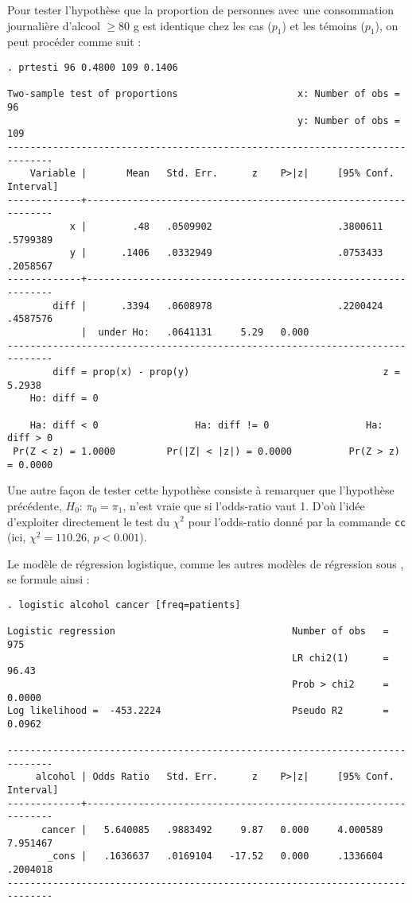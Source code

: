 Pour tester l'hypothèse que la proportion de personnes avec une consommation
journalière d'alcool $\ge 80$ g est identique chez les cas ($p_1$) et les
témoins ($p_1$), on peut procéder comme suit :
\begin{verbatim}
. prtesti 96 0.4800 109 0.1406

Two-sample test of proportions                     x: Number of obs =       96
                                                   y: Number of obs =      109
------------------------------------------------------------------------------
    Variable |       Mean   Std. Err.      z    P>|z|     [95% Conf. Interval]
-------------+----------------------------------------------------------------
           x |        .48   .0509902                      .3800611    .5799389
           y |      .1406   .0332949                      .0753433    .2058567
-------------+----------------------------------------------------------------
        diff |      .3394   .0608978                      .2200424    .4587576
             |  under Ho:   .0641131     5.29   0.000
------------------------------------------------------------------------------
        diff = prop(x) - prop(y)                                  z =   5.2938
    Ho: diff = 0

    Ha: diff < 0                 Ha: diff != 0                 Ha: diff > 0
 Pr(Z < z) = 1.0000         Pr(|Z| < |z|) = 0.0000          Pr(Z > z) = 0.0000
\end{verbatim}

Une autre façon de tester cette hypothèse consiste à remarquer que
l'hypothèse précédente, $H_0:\, \pi_0=\pi_1$, n'est vraie que si
l'odds-ratio vaut 1. D'où l'idée d'exploiter directement le test du $\chi^2$
pour l'odds-ratio donné par la commande \texttt{cc} (ici, $\chi^2=110.26$,
$p<0.001$). 

Le modèle de régression logistique, comme les autres modèles de régression
sous \Stata, se formule ainsi : 

\begin{verbatim}
. logistic alcohol cancer [freq=patients]

Logistic regression                               Number of obs   =        975
                                                  LR chi2(1)      =      96.43
                                                  Prob > chi2     =     0.0000
Log likelihood =  -453.2224                       Pseudo R2       =     0.0962

------------------------------------------------------------------------------
     alcohol | Odds Ratio   Std. Err.      z    P>|z|     [95% Conf. Interval]
-------------+----------------------------------------------------------------
      cancer |   5.640085   .9883492     9.87   0.000     4.000589    7.951467
       _cons |   .1636637   .0169104   -17.52   0.000     .1336604    .2004018
------------------------------------------------------------------------------
\end{verbatim}


